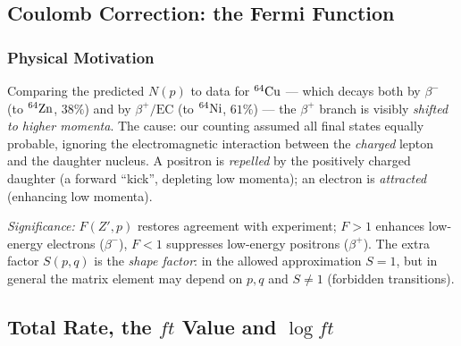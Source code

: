 
\subsection{Coulomb Correction: the Fermi Function}
\label{subsec:lec09:fermifunc}

\subsubsection*{Physical Motivation}
Comparing the predicted $N(p)$ to data for $\nucleus{Cu}{64}$ --- which decays
both by $\beta^-$ (to $\nucleus{Zn}{64}$, $38\%$) and by $\beta^+/\text{EC}$ (to
$\nucleus{Ni}{64}$, $61\%$) --- the $\beta^+$ branch is visibly \emph{shifted to
higher momenta}. The cause: our counting assumed all final states equally
probable, ignoring the electromagnetic interaction between the \emph{charged}
lepton and the daughter nucleus. A positron is \emph{repelled} by the
positively charged daughter (a forward ``kick'', depleting low momenta); an
electron is \emph{attracted} (enhancing low momenta).

\textit{Significance:} $F(Z',p)$ restores agreement with experiment; $F>1$
enhances low-energy electrons ($\beta^-$), $F<1$ suppresses low-energy positrons
($\beta^+$). The extra factor $S(p,q)$ is the \emph{shape factor}: in the allowed
approximation $S=1$, but in general the matrix element may depend on $p,q$ and
$S\neq1$ (forbidden transitions).

\subsection{Total Rate, the $ft$ Value and $\log ft$}
\label{subsec:lec09:ftvalue}

